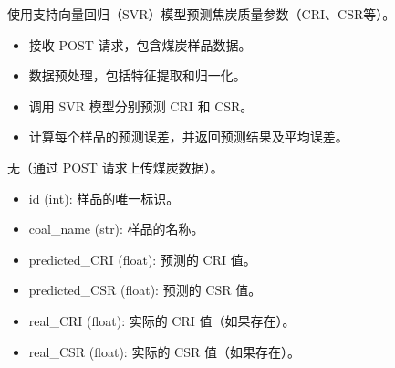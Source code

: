 \documentclass[a4paper,12pt,english]{sphinxmanual}
\begin{document}

\begin{fulllineitems}
\label{\detokenize{api/login:login.getCokeQualityfyeResultAISVR}}
\pysigstartsignatures
{}
\pysigstopsignatures
\sphinxAtStartPar
使用支持向量回归（SVR）模型预测焦炭质量参数（CRI、CSR等）。
\begin{description}
\begin{itemize}
\item {} 
\sphinxAtStartPar
接收 POST 请求，包含煤炭样品数据。

\item {} 
\sphinxAtStartPar
数据预处理，包括特征提取和归一化。

\item {} 
\sphinxAtStartPar
调用 SVR 模型分别预测 CRI 和 CSR。

\item {} 
\sphinxAtStartPar
计算每个样品的预测误差，并返回预测结果及平均误差。

\end{itemize}

\sphinxAtStartPar
无（通过 POST 请求上传煤炭数据）。

\begin{description}
\begin{itemize}
\item {} 
\sphinxAtStartPar
id (int): 样品的唯一标识。

\item {} 
\sphinxAtStartPar
coal\_name (str): 样品的名称。

\item {} 
\sphinxAtStartPar
predicted\_CRI (float): 预测的 CRI 值。

\item {} 
\sphinxAtStartPar
predicted\_CSR (float): 预测的 CSR 值。

\item {} 
\sphinxAtStartPar
real\_CRI (float): 实际的 CRI 值（如果存在）。

\item {} 
\sphinxAtStartPar
real\_CSR (float): 实际的 CSR 值（如果存在）。


\end{itemize}
\end{description}
\end{description}
\end{fulllineitems}
\end{document}
